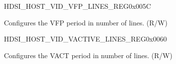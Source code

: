 \begin{register}{H}{DSI\_HOST\_VID\_VFP\_LINES\_REG}{0x005C}\label{regdesc:DSIHOSTVIDVFPLINESREG}
%
%
\regnewline%
\begin{regdesc}\begin{reglist}
\label{fielddesc:DSIHOSTVFPLINES}\item [DSI\_HOST\_VFP\_LINES] Configures the VFP period in number of lines. (R/W)
\end{reglist}\end{regdesc}
\end{register}


\begin{register}{H}{DSI\_HOST\_VID\_VACTIVE\_LINES\_REG}{0x0060}\label{regdesc:DSIHOSTVIDVACTIVELINESREG}
%
%
\regnewline%
\begin{regdesc}\begin{reglist}
\label{fielddesc:DSIHOSTVACTIVELINES}\item [DSI\_HOST\_V\_ACTIVE\_LINES] Configures the VACT period in number of lines. (R/W)
\end{reglist}\end{regdesc}
\end{register}




